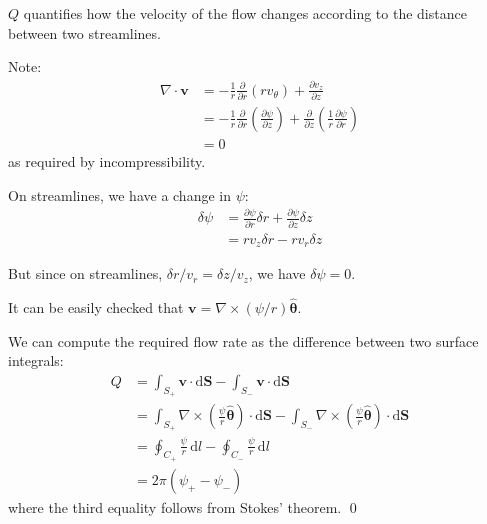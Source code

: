 \documentclass[12pt]{article}
\begin{document}
$Q$ quantifies how the velocity of the flow changes according to the distance between two streamlines.

Note:
\begin{equation}
    \begin{split}
        \nabla \cdot \mathbf{v} &= -\frac{1}{r} \frac{\partial}{\partial r} \left( r v_{\theta} \right) + \frac{\partial v_{z}}{\partial z} \\
        &= -\frac{1}{r} \frac{\partial}{\partial r} \left( \frac{\partial \psi}{\partial z} \right) + \frac{\partial}{\partial z} \left( \frac{1}{r} \frac{\partial \psi}{\partial r} \right) \\
        &= 0
    \end{split}
\end{equation}
as required by incompressibility.

On streamlines, we have a change in $\psi$:
\begin{equation}
    \begin{split}
        \delta \psi &= \frac{\partial \psi}{\partial r} \delta r + \frac{\partial \psi}{\partial z} \delta z \\
        &= r v_{z} \delta r - r v_{r} \delta z
    \end{split}
\end{equation}

But since on streamlines, $\delta r/v_{r} = \delta z/v_{z}$, we have $\delta \psi = 0$.

It can be easily checked that $\mathbf{v} = \nabla \times (\psi/r) \hat{\mathbf{\theta}}$.

We can compute the required flow rate as the difference between two surface integrals:
\begin{equation}
    \begin{split}
        Q &= \int_{S_{+}} \mathbf{v} \cdot \mathrm{d}\mathbf{S} - \int_{S_{-}} \mathbf{v} \cdot \mathrm{d}\mathbf{S} \\
        &= \int_{S_{+}} \nabla \times \left( \frac{\psi}{r} \hat{\mathbf{\theta}} \right) \cdot \mathrm{d}\mathbf{S} - \int_{S_{-}} \nabla \times \left( \frac{\psi}{r} \hat{\mathbf{\theta}} \right) \cdot \mathrm{d}\mathbf{S} \\
        &= \oint_{C_{+}} \frac{\psi}{r} \, \mathrm{d}l - \oint_{C_{-}} \frac{\psi}{r} \, \mathrm{d}l \\
        &= 2\pi (\psi_{+} - \psi_{-})
    \end{split}
\end{equation}
where the third equality follows from Stokes' theorem.
\qed
\end{document}

